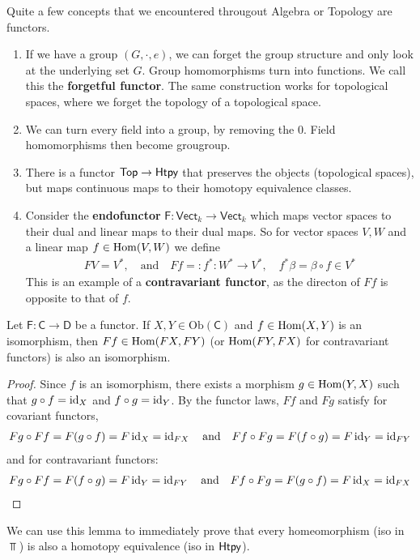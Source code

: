 \begin{ex}[]
  Quite a few concepts that we encountered througout Algebra or Topology are functors.
  \begin{enumerate}
    \item If we have a group $(G,\cdot,e)$, we can forget the group structure and only look at the underlying set $G$.
      Group homomorphisms turn into functions.
      We call this the \textbf{forgetful functor}.
      The same construction works for topological spaces, where we forget the topology of a topological space.
    \item We can turn every field into a group, by removing the $0$. Field homomorphisms then become grougroup.
    \item There is a functor $\text{\sffamily Top} \to \text{\sffamily Htpy}$ that preserves the objects (topological spaces), but maps continuous maps to their homotopy equivalence classes.
    \item Consider the \textbf{endofunctor} $\textsf{F}: \textsf{Vect}_k \to  \textsf{Vect}_k$ which maps vector spaces to their dual and linear maps to their dual maps.
      So for vector spaces $V,W$ and a linear map $f \in \operatorname{Hom}(V,W)$ we define
      \begin{align*}
        F V = V^{\ast}, \quad \text{and} \quad Ff =: f^{\ast}: W^{\ast} \to  V^{\ast}, \quad f^{\ast} \beta = \beta \circ f \in V^{\ast}
      \end{align*}
      This is an example of a \textbf{contravariant functor}, as the directon of $Ff$ is opposite to that of $f$.
  \end{enumerate}
\end{ex}


\begin{lem}[]\label{lem:func-iso}
Let $\textsf{F}: \textsf{C} \to  \textsf{D}$ be a functor.
If $X,Y \in \text{Ob}(\textsf{C})$ and $f \in \operatorname{Hom}(X,Y)$ is an isomorphism, then $Ff \in \operatorname{Hom}(FX,FY)$ (or $\operatorname{Hom}(FY,FX)$ for contravariant functors) is also an isomorphism.
\end{lem}
\begin{proof}
  Since $f$ is an isomorphism, there exists a morphism $g \in \operatorname{Hom}(Y,X)$ such that $g \circ f = \operatorname{id}_X$ and $f \circ g = \operatorname{id}_Y$.
  By the functor laws, $Ff$ and $Fg$ satisfy for covariant functors, 
  \begin{align*}
    Fg \circ Ff = F(g \circ f) = F \operatorname{id}_X = \operatorname{id}_{FX} \quad \text{and} \quad Ff \circ Fg = F(f \circ g) = F \operatorname{id}_Y = \operatorname{id}_{FY}
  \end{align*}
  and for contravariant functors:
  \begin{align*}
    Fg \circ Ff = F(f \circ g) = F \operatorname{id}_Y = \operatorname{id}_{F Y} \quad \text{and} \quad Ff \circ Fg = F(g \circ f) = F \operatorname{id}_X = \operatorname{id}_{F X}
  \end{align*}
\end{proof}
We can use this lemma to immediately prove that every homeomorphism (iso in $\Top$) is also a homotopy equivalence (iso in $\text{\sffamily Htpy}$).

